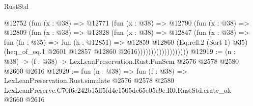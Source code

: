 \begin{lexlean}{RustStd}
\begin{coremodule}
                          @12752
                            (fun (x : @38) =>
                            @12771
                              (fun (x : @38) =>
                              @12790
                                (fun (x : @38) =>
                                @12809
                                  (fun (x : @38) =>
                                  @12828
                                    (fun (x : @38) =>
                                    @12847
                                      (fun (x : @38) =>
                                      fun (fn : @35) =>
                                      fun (h : @12851) =>
                                      @12859
                                        @12860
                                        (Eq.refl.{2} (Sort 1) @35)
                                        (heq_of_eq.{1} @2601 @12857 @12860 @2616)))))))))))))))))))
@12919 := (n : @38) -> (f : @38) -> LexLeanPreservation.Rust.FunSem @2576 @2578 @2580 @2660 @2616
@12929 := fun (n : @38) =>
  fun (f : @38) =>
  LexLeanPreservation.Rust.simulate
    @2576
    @2578
    @2580
    LexLeanPreserve.C70f6e242b15ff5fd4e1505de65e05e9e.R0.RustStd.crate_ok
    @2660
    @2616
\end{coremodule}
\end{lexlean}
